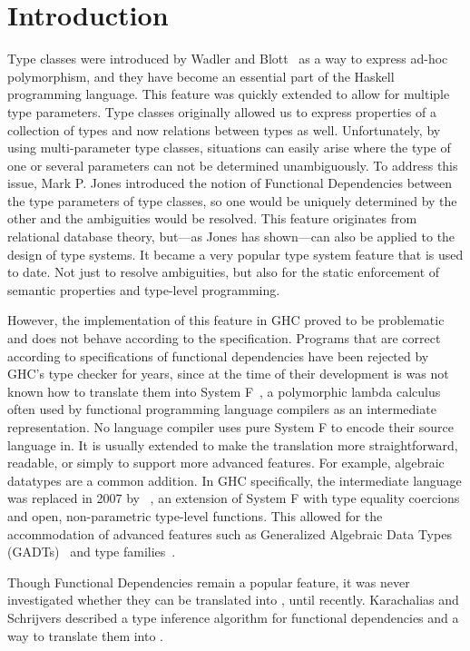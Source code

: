\chapter{Introduction}
\label{cha:intro}
Type classes were introduced by Wadler and Blott~\cite{Wadler:1989:MAP:75277.75283}
as a
way to express ad-hoc polymorphism, and they have become an essential part of the Haskell
programming language. This feature was quickly extended to allow for multiple
type parameters. Type classes originally allowed us to express properties of a
collection of types and now relations between types as well. Unfortunately, by using
multi-parameter type classes, situations can easily arise where the type
of one or several parameters can not be determined unambiguously. To address this issue,
Mark P. Jones introduced the notion of Functional Dependencies
\cite{Jones00typeclasses} between the type parameters of type classes, so one
would be uniquely determined by the other and the ambiguities would be resolved.
This feature originates from relational database theory, but---as Jones has shown---can also be applied to
the design of type systems. It became a very popular type system feature that is
used to date. Not just to resolve ambiguities, but also for the
static enforcement of semantic properties and type-level programming.

However, the implementation of this feature in GHC proved to be problematic and
does not behave according to the specification. Programs that are correct according
to specifications of functional dependencies
have been rejected by GHC's type checker for years, since at the time of their development is was not known how to translate them into System
F~\cite{systemf},
a polymorphic
lambda calculus often used by functional programming language compilers as an
intermediate representation. No language compiler uses pure System F to encode
their source language in. It is usually extended to make the translation more
straightforward, readable, or simply to support more advanced features. For
example, algebraic datatypes are a common addition. In GHC specifically, the intermediate language was replaced in 2007
by \systemfc~\cite{Sulzmann:2007:SFT:1190315.1190324}, an extension of
System F with type equality coercions and open, non-parametric type-level
functions. This allowed for the accommodation of advanced features such as
Generalized Algebraic Data Types (GADTs)~\cite{PeytonJones06} and type
families~\cite{AssociatedTypeSynonyms}.

Though Functional Dependencies remain a popular feature, it was never
investigated whether they can be translated into \systemfc, until
recently. Karachalias and Schrijvers \cite{Karachalias:2017:EFD:3156695.3122966}
described a type inference algorithm for functional dependencies and a way to
translate them into \systemfc.

